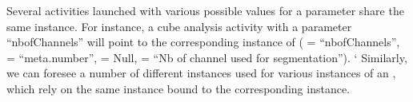 Several activities launched with various possible values for a parameter share the same  instance.
For instance, a cube analysis activity with a parameter ``nbofChannels'' will point to the corresponding instance of  ( = ``nbofChannels'',  = ``meta.number'',  = Null,  = ``Nb of channel used for segmentation'').
`
Similarly, we can foresee a number of different  instances used for various instances of an , which rely on the same  instance bound to the corresponding  instance.
